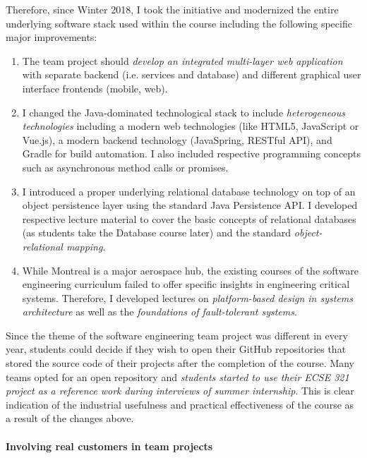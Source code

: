 \documentclass[a4paper,11pt]{article}
\begin{document}
Therefore, since Winter 2018, I took the initiative and modernized the entire underlying software stack used within the course including the following specific major improvements:
\begin{enumerate}
\item The team project should \emph{develop an integrated multi-layer web application} with separate backend (i.e. services and database) and different graphical user interface frontends (mobile, web). 
\item I changed the Java-dominated technological stack to include \emph{heterogeneous technologies} including a modern web technologies (like HTML5, JavaScript or Vue.js), a modern backend technology (JavaSpring, RESTful API), and Gradle for build automation. I also included respective programming concepts such as asynchronous method calls or promises. 
\item I introduced a proper underlying relational database technology on top of an object persistence layer using the standard Java Persistence API. I developed respective lecture material to cover the basic concepts of relational databases (as students take the Database course later) and the standard \emph{object-relational mapping}.  
\item While Montreal is a major aerospace hub, the existing courses of the software engineering curriculum failed to offer specific insights in engineering critical systems. Therefore, I developed lectures on \emph{platform-based design in systems architecture} as well as the \emph{foundations of fault-tolerant systems}.
\end{enumerate}

Since the theme of the software engineering team project was different in every year, students could decide if they wish to open their GitHub repositories that stored the source code of their projects after the completion of the course. Many teams opted for an open repository and \emph{students started to use their ECSE 321 project as a reference work during interviews of summer internship}. This is clear indication of the industrial usefulness and practical effectiveness of the course as a result of the changes above. 

\paragraph{Involving real customers in team projects}
\end{document}
